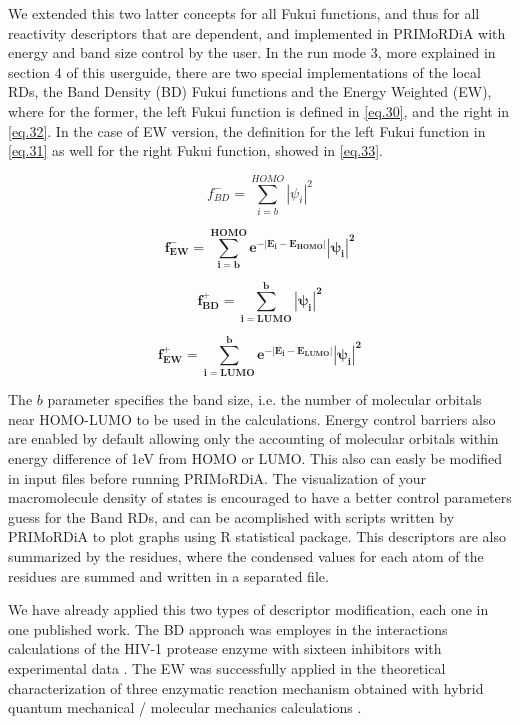 \documentclass[a4paper,11pt]{refart}
\begin{document}
We extended this two latter concepts for all Fukui functions, and thus for all reactivity descriptors that are dependent, and implemented in PRIMoRDiA with energy and band size control by the user. In the run mode 3, more explained in section 4 of this userguide, there are two special implementations of the local RDs, the Band Density (BD) Fukui functions and the Energy Weighted (EW), where for the former, the left Fukui function is defined in \autoref{eq.30}, and the right in \autoref{eq.32}. In the case of EW version, the definition for the left Fukui function in \autoref{eq.31} as well for the right Fukui function, showed in \autoref{eq.33}. 
 
\begin{equation}
f^-_{BD} = \sum^{HOMO}_{i=b} |\psi_i|^2 
\label{eq.30}
\end{equation}

\begin{equation}
\mathbf{f^-_{EW} = \sum^{HOMO}_{i=b} e^{-|E_{i}-E_{HOMO}|}|\psi_i|^2}
\label{eq.31}
\end{equation}

\begin{equation}
\mathbf{f^+_{BD} = \sum^{b}_{i=LUMO} |\psi_i|^2 }
\label{eq.32}
\end{equation}

\begin{equation}
\mathbf{f^+_{EW} =  \sum^{b}_{i=LUMO} e^{-|E_{i}-E_{LUMO}|} |\psi_i|^2}
\label{eq.33}
\end{equation}

The $b$ parameter specifies the band size, i.e. the number of molecular orbitals near HOMO-LUMO to be used in the calculations. Energy control barriers also are enabled by default allowing only the accounting of molecular orbitals within energy difference of 1eV from HOMO or LUMO. This also can easly be modified in input files before running PRIMoRDiA. The visualization of your macromolecule density of states is encouraged to have a better control parameters guess for the Band RDs, and can be acomplished with scripts written by PRIMoRDiA to plot graphs using R statistical package. This descriptors are also summarized by the residues, where the condensed values for each atom of the residues are summed and written in a separated file.

We have already applied this two types of descriptor modification, each one in one published work. The BD approach was employes in the interactions calculations of the HIV-1 protease enzyme with sixteen inhibitors with experimental data \cite{grillo2020semiempirical}. The EW was successfully applied in the theoretical characterization of three enzymatic reaction mechanism obtained with hybrid quantum mechanical / molecular mechanics calculations \cite{grillo2020elucidating}.
\end{document}
